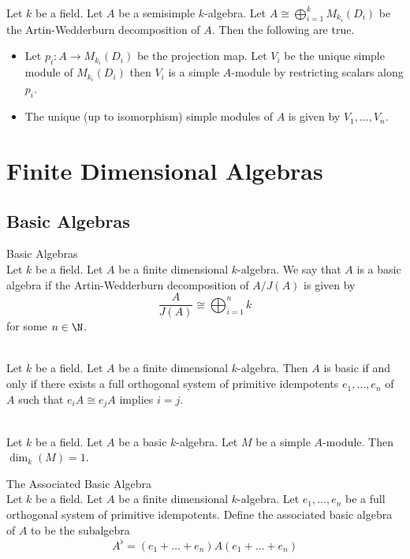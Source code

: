 \documentclass[a4paper]{article}
\begin{document}
\begin{prp}{}{}\\
Let $k$ be a field. Let $A$ be a semisimple $k$-algebra. Let $A\cong\bigoplus_{i=1}^kM_{k_i}(D_i)$ be the Artin-Wedderburn decomposition of $A$. Then the following are true. 
\begin{itemize}
\item Let $p_i:A\to M_{k_i}(D_i)$ be the projection map. Let $V_i$ be the unique simple module of $M_{k_i}(D_i)$ then $V_i$ is a simple $A$-module by restricting scalars along $p_i$. 
\item The unique (up to isomorphism) simple modules of $A$ is given by $V_1,\dots,V_n$. 
\end{itemize}
\end{prp}

\pagebreak
\section{Finite Dimensional Algebras}
\subsection{Basic Algebras}
\begin{defn}{Basic Algebras}{}\\
Let $k$ be a field. Let $A$ be a finite dimensional $k$-algebra. We say that $A$ is a basic algebra if the Artin-Wedderburn decomposition of $A/J(A)$ is given by $$\frac{A}{J(A)}\cong\bigoplus_{i=1}^nk$$ for some $n\in\N$. 
\end{defn}

\begin{prp}{}{}\\
Let $k$ be a field. Let $A$ be a finite dimensional $k$-algebra. Then $A$ is basic if and only if there exists a full orthogonal system of primitive idempotents $e_1,\dots,e_n$ of $A$ such that $e_iA\cong e_jA$ implies $i=j$. 
\end{prp}

\begin{prp}{}{}\\
Let $k$ be a field. Let $A$ be a basic $k$-algebra. Let $M$ be a simple $A$-module. Then $\dim_k(M)=1$. 
\end{prp}

\begin{defn}{The Associated Basic Algebra}{}\\
Let $k$ be a field. Let $A$ be a finite dimensional $k$-algebra. Let $e_1,\dots,e_n$ be a full orthogonal system of primitive idempotents. Define the associated basic algebra of $A$ to be the subalgebra $$A^\flat=(e_1+\dots+e_n)A(e_1+\dots+e_n)$$
\end{defn}
\end{document}
